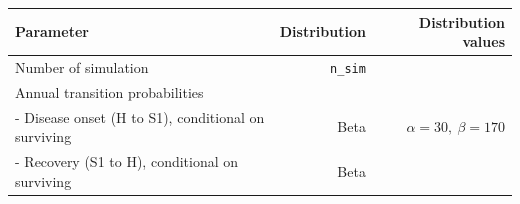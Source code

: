 \documentclass[
]{article}
\begin{document}
\begin{longtable}[]{@{}lrr@{}}
\toprule
\begin{minipage}[b]{0.32\columnwidth}\raggedright
\textbf{Parameter}\strut
\end{minipage} & \begin{minipage}[b]{0.17\columnwidth}\raggedleft
\textbf{Distribution}\strut
\end{minipage} & \begin{minipage}[b]{0.42\columnwidth}\raggedleft
\textbf{Distribution values}\strut
\end{minipage}\tabularnewline
\midrule
\endhead
\begin{minipage}[t]{0.32\columnwidth}\raggedright
Number of simulation\strut
\end{minipage} & \begin{minipage}[t]{0.17\columnwidth}\raggedleft
\texttt{n\_sim}\strut
\end{minipage} & \begin{minipage}[t]{0.42\columnwidth}\raggedleft
1000\strut
\end{minipage}\tabularnewline
\begin{minipage}[t]{0.32\columnwidth}\raggedright
Annual transition probabilities\strut
\end{minipage} & \begin{minipage}[t]{0.17\columnwidth}\raggedleft
\strut
\end{minipage} & \begin{minipage}[t]{0.42\columnwidth}\raggedleft
\strut
\end{minipage}\tabularnewline
\begin{minipage}[t]{0.32\columnwidth}\raggedright
- Disease onset (H to S1), conditional on surviving\strut
\end{minipage} & \begin{minipage}[t]{0.17\columnwidth}\raggedleft
Beta\strut
\end{minipage} & \begin{minipage}[t]{0.42\columnwidth}\raggedleft
\(\alpha=30, \ \beta=170\)\strut
\end{minipage}\tabularnewline
\begin{minipage}[t]{0.32\columnwidth}\raggedright
- Recovery (S1 to H), conditional on surviving\strut
\end{minipage} & \begin{minipage}[t]{0.17\columnwidth}\raggedleft
Beta\strut
\end{minipage} & \begin{minipage}[t]{0.42\columnwidth}\raggedleft

\end{minipage}
\end{longtable}
\end{document}
